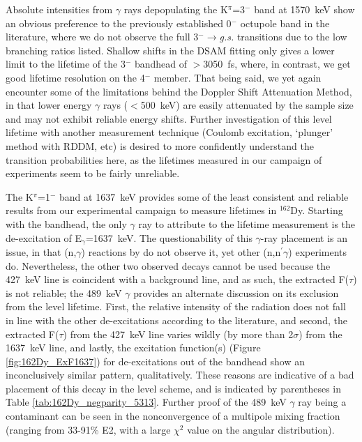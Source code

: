 Absolute intensities from $\gamma$ rays depopulating the K$^\pi$=3$^-$ band at 1570~keV show an obvious preference to the previously established 0$^-$ octupole band \cite{Aprahamian200642} in the literature, where we do not observe the full 3$^-\rightarrow$\textit{g.s.} transitions due to the low branching ratios listed. Shallow shifts in the DSAM fitting only gives a lower limit to the lifetime of the 3$^-$ bandhead of $>$3050~fs, where, in contrast, we get good lifetime resolution on the 4$^-$ member. That being said, we yet again encounter some of the limitations behind the Doppler Shift Attenuation Method, in that lower energy $\gamma$ rays ($<$500~keV) are easily attenuated by the sample size and may not exhibit reliable energy shifts. Further investigation of this level lifetime with another measurement technique (Coulomb excitation, `plunger' method with RDDM, etc) is desired to more confidently understand the transition probabilities here, as the lifetimes measured in our campaign of experiments seem to be fairly unreliable. 


The K$^\pi$=1$^-$ band at 1637~keV provides some of the least consistent and reliable results from our experimental campaign to measure lifetimes in $^{162}$Dy. Starting with the bandhead, the only $\gamma$ ray to attribute to the lifetime measurement is the de-excitation of E$_\gamma$=1637~keV. The questionability of this $\gamma$-ray placement is an issue, in that (n,$\gamma$) reactions by \cite{Aprahamian200642} do not observe it, yet other (n,n$^\prime\gamma$) experiments do. Nevertheless, the other two observed decays cannot be used because the 427~keV line is coincident with a background line, and as such, the extracted F($\tau$) is not reliable; the 489~keV $\gamma$ provides an alternate discussion on its exclusion from the level lifetime. First, the relative intensity of the radiation does not fall in line with the other de-excitations according to the literature, and second, the extracted F($\tau$) from the 427~keV line varies wildly (by more than 2$\sigma$) from the 1637~keV line, and lastly, the excitation function(s) (Figure \ref{fig:162Dy_ExF1637}) for de-excitations out of the bandhead show an inconclusively similar pattern, qualitatively. These reasons are indicative of a bad placement of this decay in the level scheme, and is indicated by parentheses in Table \ref{tab:162Dy_negparity_5313}. Further proof of the 489~keV $\gamma$ ray being a contaminant can be seen in the nonconvergence of a multipole mixing fraction (ranging from 33-91\% E2, with a large $\chi^2$ value on the angular distribution).

